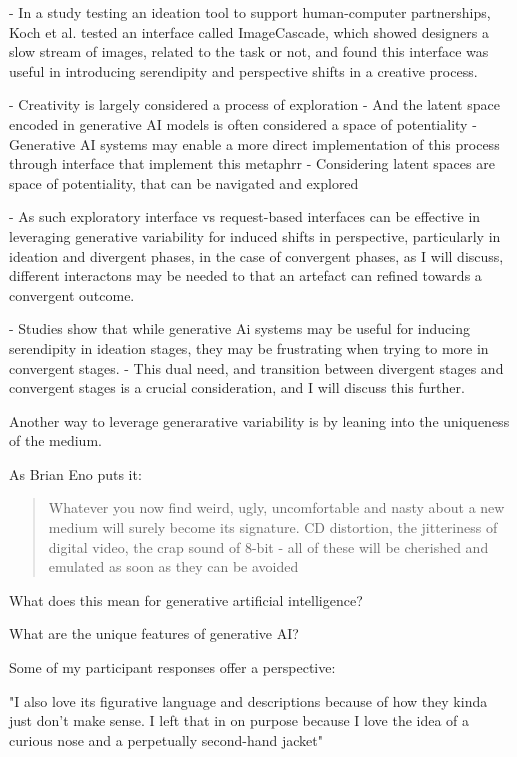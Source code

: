 - In a study testing an ideation tool to support human-computer partnerships, Koch et al. \cite{Koch2020-gx} tested an interface called ImageCascade, which showed designers a slow stream of images, related to the task or not, and found this interface was useful in introducing serendipity and perspective shifts in a creative process. 


- Creativity is largely considered a process of exploration \cite{Boden1998-yn, Wiggins2019-yj}
- And the latent space encoded in generative AI models is often considered a space of potentiality \cite{Schaerf2024-gf}
- Generative AI systems may enable a more direct implementation of this process through interface that implement this metaphrr
- Considering latent spaces are space of potentiality, that can be navigated and explored

- As such exploratory interface vs request-based interfaces can be effective in leveraging generative variability for induced shifts in perspective, particularly in ideation and divergent phases, in the case of convergent phases, as I will discuss, different interactons may be needed to that an artefact can refined towards a convergent outcome. 

- Studies show that while generative Ai systems may be useful for inducing serendipity in ideation stages, they may be frustrating when trying to more in convergent stages. 
- This dual need, and transition between divergent stages and convergent stages is a crucial consideration, and I will discuss this further. 



Another way to leverage generarative variability is by leaning into the uniqueness of the medium. 

As Brian Eno puts it: 

\begin{quote}
    Whatever you now find weird, ugly, uncomfortable and nasty about a new medium will surely become its signature. CD distortion, the jitteriness of digital video, the crap sound of 8-bit - all of these will be cherished and emulated as soon as they can be avoided \cite{Eno2007-fl}
\end{quote}

What does this mean for generative artificial intelligence? 

What are the unique features of generative AI?


Some of my participant responses offer a perspective:

"I also love its figurative language and descriptions because of how they kinda just don't make sense. I left that in on purpose because I love the idea of a curious nose and a perpetually second-hand jacket"


